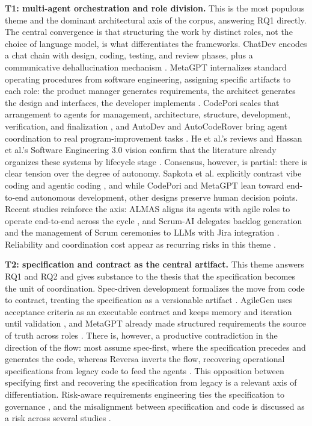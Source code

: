 \noindent\textbf{T1: multi-agent orchestration and role division.} This is the most populous theme and the dominant architectural axis of the corpus, answering RQ1 directly. The central convergence is that structuring the work by distinct roles, not the choice of language model, is what differentiates the frameworks. ChatDev encodes a chat chain with design, coding, testing, and review phases, plus a communicative dehallucination mechanism \cite{ChenQian2023}. MetaGPT internalizes standard operating procedures from software engineering, assigning specific artifacts to each role: the product manager generates requirements, the architect generates the design and interfaces, the developer implements \cite{SiruiHong2023}. CodePori scales that arrangement to agents for management, architecture, structure, development, verification, and finalization \cite{ZeeshanRasheed2024}, and AutoDev and AutoCodeRover bring agent coordination to real program-improvement tasks \cite{MicheleTufano2024,YuntongZhang2024}. He et al.'s reviews and Hassan et al.'s Software Engineering 3.0 vision confirm that the literature already organizes these systems by lifecycle stage \cite{JundaHe2025,AhmedEHassan2024}. Consensus, however, is partial: there is clear tension over the degree of autonomy. Sapkota et al. explicitly contrast vibe coding and agentic coding \cite{RanjanSapkota2025}, and while CodePori and MetaGPT lean toward end-to-end autonomous development, other designs preserve human decision points. Recent studies reinforce the axis: ALMAS aligns its agents with agile roles to operate end-to-end across the cycle \cite{Tawosi2025}, and Scrum-AI delegates backlog generation and the management of Scrum ceremonies to LLMs with Jira integration \cite{Erten2025}. Reliability and coordination cost appear as recurring risks in this theme \cite{Dam2025,Alsegier2026,Merchant2025,Paduraru2026,SKaruppuchamy2026,Paiva2026,Akbar2025,LiyiCai2025,Anon2026,BESLEAGA2026}.

\noindent\textbf{T2: specification and contract as the central artifact.} This theme answers RQ1 and RQ2 and gives substance to the thesis that the specification becomes the unit of coordination. Spec-driven development formalizes the move from code to contract, treating the specification as a versionable artifact \cite{DeepakBabuPiskala2026}. AgileGen uses acceptance criteria as an executable contract and keeps memory and iteration until validation \cite{SaiZhang2025}, and MetaGPT already made structured requirements the source of truth across roles \cite{SiruiHong2023}. There is, however, a productive contradiction in the direction of the flow: most assume spec-first, where the specification precedes and generates the code, whereas Reversa inverts the flow, recovering operational specifications from legacy code to feed the agents \cite{Macedo2026}. This opposition between specifying first and recovering the specification from legacy is a relevant axis of differentiation. Risk-aware requirements engineering ties the specification to governance \cite{Watfa2026}, and the misalignment between specification and code is discussed as a risk across several studies \cite{DeepakBabuPiskala2026,Paduraru2026,Watfa2026,YuCheng2023,Gupta2022,MitulModi2024,Khan2026,Gadamsetty2025}.

